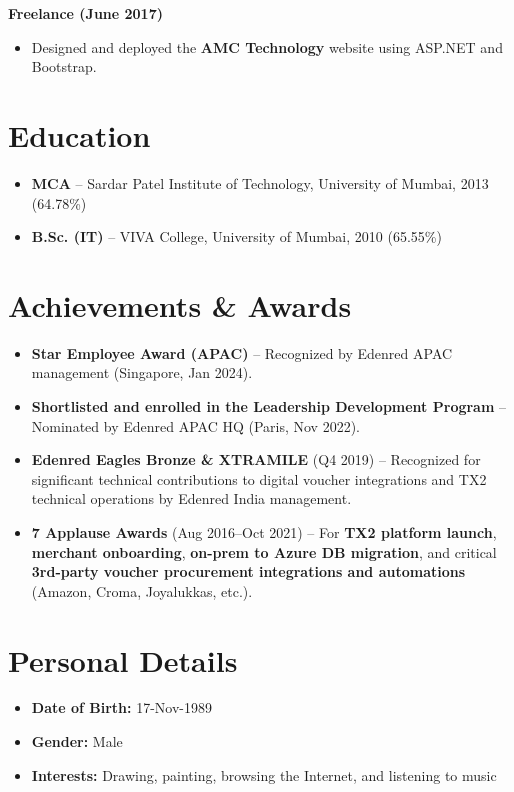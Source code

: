 \documentclass[12pt,a4paper]{article}
\begin{document}
\textbf{Freelance (June 2017)}
\begin{itemize}
    \item Designed and deployed the \textbf{AMC Technology} website using ASP.NET and Bootstrap.
\end{itemize}

\section*{Education}
\begin{itemize}
    \item \textbf{MCA} -- Sardar Patel Institute of Technology, University of Mumbai, 2013 \quad (64.78\%)
    \item \textbf{B.Sc. (IT)} -- VIVA College, University of Mumbai, 2010 \quad (65.55\%)
\end{itemize}

\section*{Achievements \& Awards}
\begin{itemize}
    \item \textbf{Star Employee Award (APAC)} -- Recognized by Edenred APAC management (Singapore, Jan 2024).
    \item \textbf{Shortlisted and enrolled in the Leadership Development Program} -- Nominated by Edenred APAC HQ (Paris, Nov 2022).
    \item \textbf{Edenred Eagles Bronze \& XTRAMILE} (Q4 2019) -- Recognized for significant technical contributions to digital voucher integrations and TX2 technical operations by Edenred India management.
    \item \textbf{7 Applause Awards} (Aug 2016--Oct 2021) -- For \textbf{TX2 platform launch}, \textbf{merchant onboarding}, \textbf{on-prem to Azure DB migration}, and critical \textbf{3rd-party voucher procurement integrations and automations} (Amazon, Croma, Joyalukkas, etc.).
\end{itemize}

\section*{Personal Details}
\begin{itemize}
    \item \textbf{Date of Birth:} 17-Nov-1989
    \item \textbf{Gender:} Male
    \item \textbf{Interests:} Drawing, painting, browsing the Internet, and listening to music
\end{itemize}

\vspace{16pt}
\end{document}
